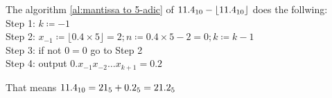 \documentclass{gadsescript}
\begin{document}
\begin{enumerate}[label=\alph*)]
		The algorithm \ref{al:mantissa to 5-adic} of $ \num{11.4}_{10} - \lfloor \num{11.4}_{10} \rfloor $ does the follwing:\\
		Step 1: $ k \coloneqq -1 $\\
		Step 2: $ x_{-1} \coloneqq \lfloor 0.4 \times 5 \rfloor = 2; n \coloneqq 0.4 \times 5 - 2 = 0; k \coloneqq k - 1 $\\
		Step 3: if not $ 0 = 0 $ go to Step 2\\
		Step 4: output $ 0.x_{-1} x_{-2} \dotso x_{k+1} = 0.2 $

		That means $\num{11.4}_{10} = 21_{5} + \num{0.2}_{5} = \num{21.2}_5$

\end{enumerate}
\end{document}
